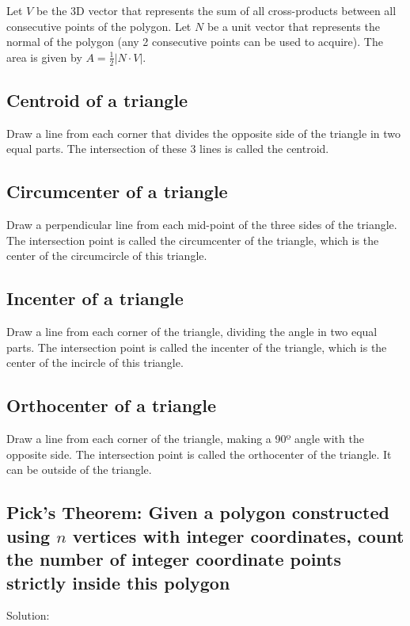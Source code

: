 \documentclass[12pt]{article}%
\begin{document}
Let $V$ be the 3D vector that represents the sum of all cross-products between all consecutive points of the polygon. Let $N$ be a unit vector that represents the normal of the polygon (any 2 consecutive points can be used to acquire). The area is given by $A = \frac{1}{2}|N \cdot V|$. 

\subsection{Centroid of a triangle}

Draw a line from each corner that divides the opposite side of the triangle in two equal parts. The intersection of these 3 lines is called the centroid.

\subsection{Circumcenter of a triangle}

Draw a perpendicular line from each mid-point of the three sides of the triangle. The intersection point is called the circumcenter of the triangle, which is the center of the circumcircle of this triangle.

\subsection{Incenter of a triangle}

Draw a line from each corner of the triangle, dividing the angle in two equal parts. The intersection point is called the incenter of the triangle, which is the center of the incircle of this triangle.

\subsection{Orthocenter of a triangle}

Draw a line from each corner of the triangle, making a 90º angle with the opposite side. The intersection point is called the orthocenter of the triangle. It can be outside of the triangle.

\subsection{Pick's Theorem: Given a polygon constructed using $n$ vertices with integer coordinates, count the number of integer coordinate points strictly inside this polygon}

Solution:
\end{document}

